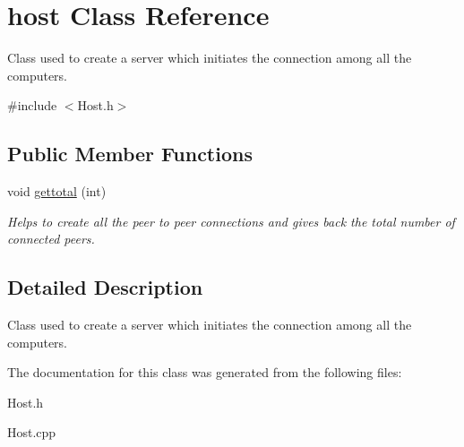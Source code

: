 \hypertarget{classhost}{\section{host Class Reference}
\label{classhost}
}


Class used to create a server which initiates the connection among all the computers.  




{\ttfamily \#include $<$Host.\-h$>$}

\subsection*{Public Member Functions}
\begin{DoxyCompactItemize}
\item 
\hypertarget{classhost_a19eb54ba01addfb7307d2a1a0b0e34a1}{void \hyperlink{classhost_a19eb54ba01addfb7307d2a1a0b0e34a1}{gettotal} (int)}\label{classhost_a19eb54ba01addfb7307d2a1a0b0e34a1}

\begin{DoxyCompactList}\small\item\em Helps to create all the peer to peer connections and gives back the total number of connected peers. \end{DoxyCompactList}\end{DoxyCompactItemize}


\subsection{Detailed Description}
Class used to create a server which initiates the connection among all the computers. 

The documentation for this class was generated from the following files\-:\begin{DoxyCompactItemize}
\item 
Host.\-h\item 
Host.\-cpp\end{DoxyCompactItemize}
